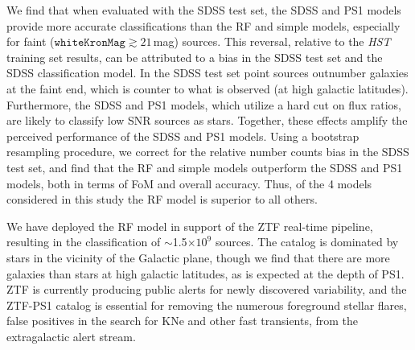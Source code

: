 \documentclass[twocolumn]{aastex62}
\begin{document}
\begin{CJK*}{UTF8}{gbsn}
We find that when evaluated with the SDSS test set, the SDSS and PS1 models
provide more accurate classifications than the RF and simple models,
especially for faint ($\mathtt{whiteKronMag} \gtrsim 21$\,mag) sources. This
reversal, relative to the \textit{HST} training set results, can be
attributed to a bias in the SDSS test set and the SDSS classification model.
In the SDSS test set point sources outnumber galaxies at the faint end,
which is counter to what is observed (at high galactic latitudes).
Furthermore, the SDSS and PS1 models, which utilize a hard cut on flux
ratios, are likely to classify low SNR sources as stars. Together, these
effects amplify the perceived performance of the SDSS and PS1 models. Using
a bootstrap resampling procedure, we correct for the relative number counts
bias in the SDSS test set, and find that the RF and simple models outperform
the SDSS and PS1 models, both in terms of FoM and overall accuracy. Thus, of
the 4 models considered in this study the RF model is superior to all others.

We have deployed the RF model in support of the ZTF real-time pipeline,
resulting in the classification of $\sim$1.5$\times 10^{9}$ sources. The
catalog is dominated by stars in the vicinity of the Galactic plane, though
we find that there are more galaxies than stars at high galactic latitudes,
as is expected at the depth of PS1. ZTF is currently producing public alerts
for newly discovered variability, and the ZTF-PS1 catalog is essential for
removing the numerous foreground stellar flares, false positives in the
search for KNe and other fast transients, from the extragalactic alert
stream.


\end{CJK*}
\end{document}
